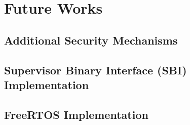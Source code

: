 \chapter{Future Works}
\label{cha:future}

\section{Additional Security Mechanisms}
\label{sec:future_security}

\section{Supervisor Binary Interface (SBI) Implementation}
\label{sec:future_sbi}

\section{FreeRTOS Implementation}
\label{sec:future_rtos}